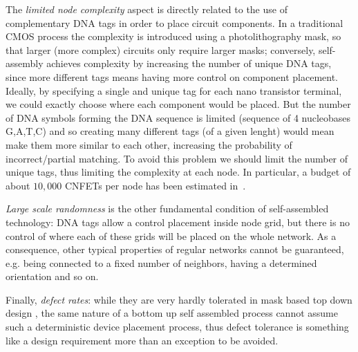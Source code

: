 The \emph{limited node complexity} aspect is directly
related to the use of complementary DNA tags in order to place circuit
components. In a traditional CMOS process the complexity is introduced
using a photolithography mask, so that larger (more complex) circuits
only require larger masks; conversely, self-assembly achieves
complexity by increasing the number of unique DNA tags, since more
different tags means having more control on component placement. Ideally, by specifying a single
and unique tag for each nano transistor terminal, we could exactly
choose where each component would be placed. But the number of DNA
symbols forming the DNA sequence is limited (sequence of 4 nucleobases
G,A,T,C) and so creating many different tags (of a given lenght) would
mean make them more similar to each other, increasing the probability
of incorrect/partial matching. To avoid this problem we should limit
the number of unique tags, thus limiting the complexity at each node.
In particular, a budget of about $10,000$ CNFETs per node has been
estimated in~\cite{liu_jetcs}.

\emph{Large scale randomness} is the other fundamental condition of
self-assembled technology: DNA tags allow a control placement inside
node grid, but there is no control of where each of these  grids will
be placed on the whole network. As a consequence, other typical
properties of regular networks cannot be guaranteed, e.g. being
connected to a fixed number of neighbors, having a determined
orientation and so on.

Finally, \emph{defect rates}: while they are very hardly tolerated in mask
based top down design , the same nature of a bottom up self
assembled process cannot assume such a deterministic device placement
process, thus defect tolerance is something like a design requirement
more than an exception to be avoided.

